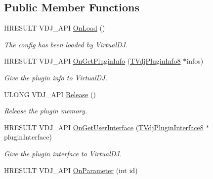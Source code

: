 \subsection*{Public Member Functions}
\begin{DoxyCompactItemize}
\item 
H\+R\+E\+S\+U\+LT V\+D\+J\+\_\+\+A\+PI \hyperlink{classCVDJartnet_aad029c72cf6bcb2baae197124a1d5493}{On\+Load} ()
\begin{DoxyCompactList}\small\item\em The config has been loaded by Virtual\+DJ. \end{DoxyCompactList}\item 
\mbox{\label{classCVDJartnet_a16aaaf2b400ca3a0489b7504ef4380f2}} 
H\+R\+E\+S\+U\+LT V\+D\+J\+\_\+\+A\+PI \hyperlink{classCVDJartnet_a16aaaf2b400ca3a0489b7504ef4380f2}{On\+Get\+Plugin\+Info} (\hyperlink{structTVdjPluginInfo8}{T\+Vdj\+Plugin\+Info8} $\ast$infos)
\begin{DoxyCompactList}\small\item\em Give the plugin info to Virtual\+DJ. \end{DoxyCompactList}\item 
\mbox{\label{classCVDJartnet_a26fc17b4324977c96db0875c2c9510b0}} 
U\+L\+O\+NG V\+D\+J\+\_\+\+A\+PI \hyperlink{classCVDJartnet_a26fc17b4324977c96db0875c2c9510b0}{Release} ()
\begin{DoxyCompactList}\small\item\em Release the plugin memory. \end{DoxyCompactList}\item 
\mbox{\label{classCVDJartnet_ab773cdddc551d8db370ef756405a4412}} 
H\+R\+E\+S\+U\+LT V\+D\+J\+\_\+\+A\+PI \hyperlink{classCVDJartnet_ab773cdddc551d8db370ef756405a4412}{On\+Get\+User\+Interface} (\hyperlink{structTVdjPluginInterface8}{T\+Vdj\+Plugin\+Interface8} $\ast$plugin\+Interface)
\begin{DoxyCompactList}\small\item\em Give the plugin interface to Virtual\+DJ. \end{DoxyCompactList}\item 
\mbox{\label{classCVDJartnet_a7acdd06e91ab522c8a5facddc4a58e43}} 
H\+R\+E\+S\+U\+LT V\+D\+J\+\_\+\+A\+PI \hyperlink{classCVDJartnet_a7acdd06e91ab522c8a5facddc4a58e43}{On\+Parameter} (int id)

\end{DoxyCompactItemize}
